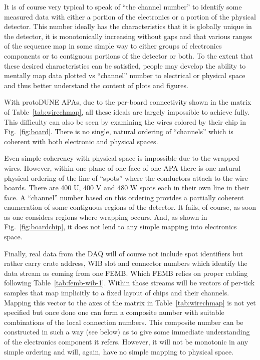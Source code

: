 \documentclass[pdftex,12pt,letter]{article}
\begin{document}
It is of course very typical to speak of ``the channel number'' to
identify some measured data with either a portion of the electronics
or a portion of the physical detector.  This number ideally has the
characteristics that it is globally unique in the detector, it is
monotonically increasing without gaps and that various ranges of the
sequence map in some simple way to either groups of electronics
components or to contiguous portions of the detector or both.  To the
extent that these desired characteristics can be satisfied, people may
develop the ability to mentally map data plotted vs ``channel'' number
to electrical or physical space and thus better understand the content
of plots and figures.

With protoDUNE APAs, due to the per-board connectivity shown in the
matrix of Table~\ref{tab:wirechmap}, all these ideals are largely
impossible to achieve fully.  This difficulty can also be seen by examining
the wires colored by their chip in Fig.~\ref{fig:board}.  There is no
single, natural ordering of ``channels'' which is coherent with both
electronic and physical spaces.

Even simple coherency with physical space is impossible due to the
wrapped wires.  However, within one plane of one face of one APA there
is one natural physical ordering of the line of ``spots'' where the
conductors attach to the wire boards.  There are 400 U,
400 V and 480 W spots each in their own line in their face.  A
``channel'' number based on this ordering provides a partially
coherent enumeration of some contiguous regions of the detector.  It
fails, of course, as soon as one considers regions where wrapping
occurs.  And, as shown in Fig.~\ref{fig:boardchip}, it does not lend
to any simple mapping into electronics space.

Finally, real data from the DAQ will of course not include spot
identifiers but rather carry crate address, WIB slot and connector
numbers which identify the data stream as coming from one FEMB.  Which
FEMB relies on proper cabling following Table~\ref{tab:femb-wib-1}.
Within those streams will be vectors of per-tick samples that map
implicitly to a fixed layout of chips and their channels.  Mapping
this vector to the axes of the matrix in Table~\ref{tab:wirechmap} is
not yet specified but once done one can form a composite number with
suitable combinations of the local connection numbers.  This composite
number can be constructed in such a way (see below) as to give some
immediate understanding of the electronics component it refers.
However, it will not be monotonic in any simple ordering and will,
again, have no simple mapping to physical space.
\end{document}
